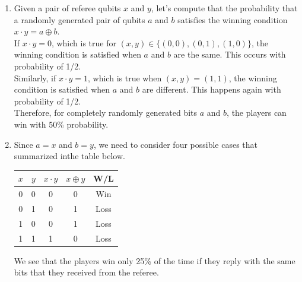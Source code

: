 \begin{solution}
\begin{enumerate}[label=(\alph*)]
    \item Given a pair of referee qubits $x$ and $y$, let's compute that the probability that a randomly generated pair of qubits $a$ and $b$ satisfies the winning condition $x\cdot y = a\oplus b$.\\
    If $x\cdot y=0$, which is true for $(x,y)\in\{(0,0), (0,1), (1,0)\}$, the winning condition is satisfied when $a$ and $b$ are the same. This occurs with probability of 1/2.\\
    Similarly, if $x\cdot y=1$, which is true when $(x,y)=(1,1)$, the winning condition is satisfied when $a$ and $b$ are different. This happens again with probability of 1/2.\\
    Therefore, for completely randomly generated bits $a$ and $b$, the players can win with 50\% probability.
    \item Since $a=x$ and $b=y$, we need to consider four possible cases that summarized inthe table below.
    \begin{table}[h]
    \setcellgapes{5pt}
    \renewcommand\theadfont{}
    \makegapedcells
    \centering
    \begin{tabular}{ccccc}
        \hline
        $x$ & $y$ & $x\cdot y$ & $x\oplus y$ & W/L \\
        \hline
        0 & 0 & 0 & 0 & Win \\
        0 & 1 & 0 & 1 & Loss \\
        1 & 0 & 0 & 1 & Loss \\
        1 & 1 & 1 & 0 & Loss \\
        \hline
    \end{tabular}
    \end{table}

    We see that the players win only 25\% of the time if they reply with the same bits that they received from the referee.
\end{enumerate}
\end{solution}

